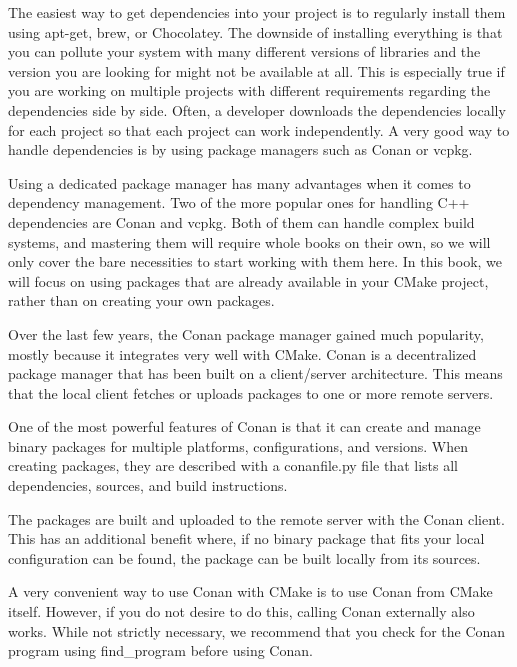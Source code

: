 
The easiest way to get dependencies into your project is to regularly install them using apt-get, brew, or Chocolatey. The downside of installing everything is that you can pollute your system with many different versions of libraries and the version you are looking for might not be available at all. This is especially true if you are working on multiple projects with different requirements regarding the dependencies side by side. Often, a developer downloads the dependencies locally for each project so that each project can work independently. A very good way to handle dependencies is by using package managers such as Conan or vcpkg.

Using a dedicated package manager has many advantages when it comes to dependency management. Two of the more popular ones for handling C++ dependencies are Conan and vcpkg. Both of them can handle complex build systems, and mastering them will require whole books on their own, so we will only cover the bare necessities to start working with them here. In this book, we will focus on using packages that are already available in your CMake project, rather than on creating your own packages.


Over the last few years, the Conan package manager gained much popularity, mostly because it integrates very well with CMake. Conan is a decentralized package manager that has been built on a client/server architecture. This means that the local client fetches or uploads packages to one or more remote servers.

One of the most powerful features of Conan is that it can create and manage binary packages for multiple platforms, configurations, and versions. When creating packages, they are described with a conanfile.py file that lists all dependencies, sources, and build instructions.

The packages are built and uploaded to the remote server with the Conan client. This has an additional benefit where, if no binary package that fits your local configuration can be found, the package can be built locally from its sources.

A very convenient way to use Conan with CMake is to use Conan from CMake itself. However, if you do not desire to do this, calling Conan externally also works. While not strictly necessary, we recommend that you check for the Conan program using find\_program before using Conan.

